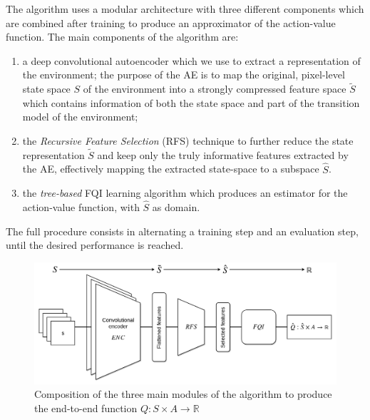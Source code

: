 The algorithm uses a modular architecture with three different components which 
are combined after training to produce an approximator of the action-value 
function. The main components of the algorithm are:
%
\begin{enumerate}
    \item a deep convolutional autoencoder which we use to extract a 
    representation of the environment;
    the purpose of the AE is to map the original, pixel-level state space $S$ of
    the environment into a strongly compressed feature space ${\tilde{S}}$ which
    contains information of both the state space and part of the transition 
    model of the environment;
    \item the \textit{Recursive Feature Selection} (RFS) technique to further 
    reduce the state representation $\tilde{S}$ and keep only the truly 
    informative features extracted by the AE, effectively mapping the extracted 
    state-space to a subspace $\hat{S}$.
    \item the \textit{tree-based} FQI learning algorithm which produces an 
    estimator for the action-value function, with $\hat{S}$ as domain. 
\end{enumerate}
%
The full procedure consists in alternating a training step and an evaluation 
step, until the desired performance is reached.
%
\begin{figure}[h]
\includegraphics[width=\textwidth]{pictures/full_pipeline}
\centering
\caption[Schematic view of the three main modules]{Composition of the three main
						   modules of the algorithm to
						   produce the end-to-end 
						   function 
						   $Q: S \times A \rightarrow \mathbb{R}$}
\label{f:full_pipeline}
\end{figure}
%

